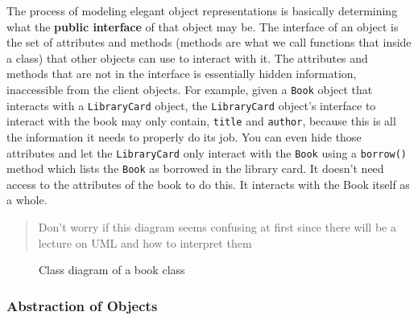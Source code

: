 The process of modeling elegant object representations is basically
determining what the \textbf{public interface} of that object may be.
The interface of an object is the set of attributes and methods (methods
are what we call functions that inside a class) that other objects can
use to interact with it. The attributes and methods that are not in the
interface is essentially hidden information, inaccessible from the
client objects. For example, given a \texttt{Book} object that interacts
with a \texttt{LibraryCard} object, the \texttt{LibraryCard} object's
interface to interact with the book may only contain, \texttt{title} and
\texttt{author}, because this is all the information it needs to
properly do its job. You can even hide those attributes and let the
\texttt{LibraryCard} only interact with the \texttt{Book} using a
\texttt{borrow()} method which lists the \texttt{Book} as borrowed in
the library card. It doesn't need access to the attributes of the book
to do this. It interacts with the Book itself as a whole.

\begin{quote}
Don't worry if this diagram seems confusing at first since there will be
a lecture on UML and how to interpret them
\end{quote}

\begin{figure}
\centering
{}
\caption{Class diagram of a book class}
\end{figure}

\subsubsection{Abstraction of
Objects}\label{object-oriented-programming-paradigm.md__abstraction-of-objects}


